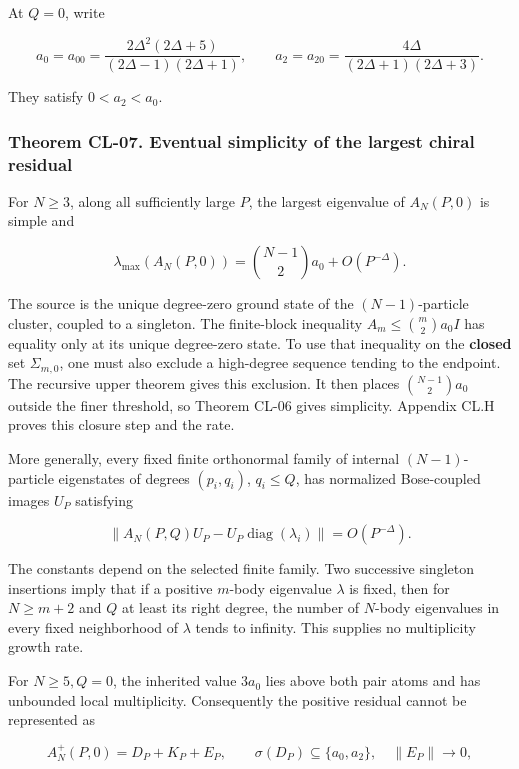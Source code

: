 \documentclass[a4paper,11pt]{article}
\numberwithin{equation}{section}
\begin{document}
At \(Q=0\), write

\[
a_0=a_{00}=\frac{2\Delta^2(2\Delta+5)}{(2\Delta-1)(2\Delta+1)},
\qquad
a_2=a_{20}=\frac{4\Delta}{(2\Delta+1)(2\Delta+3)}.
\]

They satisfy \(0<a_2<a_0\).

\hypertarget{theorem-cl-07.-eventual-simplicity-of-the-largest-chiral-residual}{%
\subsubsection{Theorem CL-07. Eventual simplicity of the largest chiral residual}\label{theorem-cl-07.-eventual-simplicity-of-the-largest-chiral-residual}}

For \(N\geq3\), along all sufficiently large \(P\), the largest eigenvalue of \(A_N(P,0)\) is simple and

\[
\lambda_{\max}(A_N(P,0))
=\binom{N-1}{2}a_0+O(P^{-\Delta}).
\tag{CL.20}
\]

The source is the unique degree-zero ground state of the \((N-1)\)-particle cluster, coupled to a singleton. The finite-block inequality \(A_m\leq\binom m2a_0I\) has equality only at its unique degree-zero state. To use that inequality on the \textbf{closed} set \(\Sigma_{m,0}\), one must also exclude a high-degree sequence tending to the endpoint. The recursive upper theorem gives this exclusion. It then places \(\binom{N-1}{2}a_0\) outside the finer threshold, so Theorem CL-06 gives simplicity. Appendix CL.H proves this closure step and the rate.

More generally, every fixed finite orthonormal family of internal \((N-1)\)-particle eigenstates of degrees \((p_i,q_i)\), \(q_i\leq Q\), has normalized Bose-coupled images \(U_P\) satisfying

\[
\|A_N(P,Q)U_P-U_P\operatorname{diag}(\lambda_i)\|
=O(P^{-\Delta}).
\tag{CL.21}
\]

The constants depend on the selected finite family. Two successive singleton insertions imply that if a positive \(m\)-body eigenvalue \(\lambda\) is fixed, then for \(N\geq m+2\) and \(Q\) at least its right degree, the number of \(N\)-body eigenvalues in every fixed neighborhood of \(\lambda\) tends to infinity. This supplies no multiplicity growth rate.

For \(N\geq5,Q=0\), the inherited value \(3a_0\) lies above both pair atoms and has unbounded local multiplicity. Consequently the positive residual cannot be represented as

\[
A_N^+(P,0)=D_P+K_P+E_P,
\qquad \sigma(D_P)\subseteq\{a_0,a_2\},\quad\|E_P\|\to0,
\tag{CL.22}
\]
\end{document}
